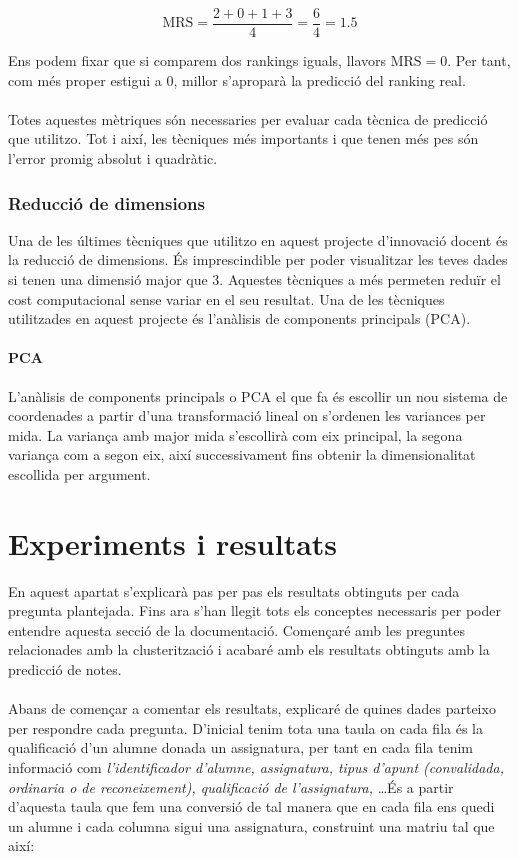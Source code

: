 \documentclass[12pt,a4paper,catalan]{article}
\begin{document}
$$ \mathrm{MRS} = \frac{2 + 0 + 1 + 3}{4} = \frac{6}{4} = 1.5$$

Ens podem fixar que si comparem dos rankings iguals, llavors $\mathrm{MRS} = 0$. Per tant, com més proper estigui a 0, millor s'aproparà la predicció del ranking real.
\\
\\
Totes aquestes mètriques són necessaries per evaluar cada tècnica de predicció que utilitzo. Tot i així, les tècniques més importants i que tenen més pes són l'error promig absolut i quadràtic.

\subsubsection{Reducció de dimensions}
Una de les últimes tècniques que utilitzo en aquest projecte d'innovació docent és la reducció de dimensions. És imprescindible per poder visualitzar les teves dades si tenen una dimensió major que 3. Aquestes tècniques a més permeten reduïr el cost computacional sense variar en el seu resultat. Una de les tècniques utilitzades en aquest projecte és l'anàlisis de components principals (PCA).

\paragraph{PCA}
L'anàlisis de components principals o PCA \cite{pca} el que fa és escollir un nou sistema de coordenades a partir d'una transformació lineal on s'ordenen les variances per mida. La variança amb major mida s'escollirà com eix principal, la segona variança com a segon eix, així successivament fins obtenir la dimensionalitat escollida per argument.


\newpage

\section{Experiments i resultats}
En aquest apartat s'explicarà pas per pas els resultats obtinguts per cada pregunta plantejada. Fins ara s'han llegit tots els conceptes necessaris per poder entendre aquesta secció de la documentació. Començaré amb les preguntes relacionades amb la clusterització i acabaré amb els resultats obtinguts amb la predicció de notes.
\\
\\
Abans de començar a comentar els resultats, explicaré de quines dades parteixo per respondre cada pregunta. D'inicial tenim tota una taula on cada fila és la qualificació d'un alumne donada un assignatura, per tant en cada fila tenim informació com \textit{l'identificador d'alumne, assignatura, tipus d'apunt (convalidada, ordinaria o de reconeixement), qualificació de l'assignatura,} \ldots És a partir d'aquesta taula que fem una conversió de tal manera que en cada fila ens quedi un alumne i cada columna sigui una assignatura, construint una matriu tal que així:
\end{document}
